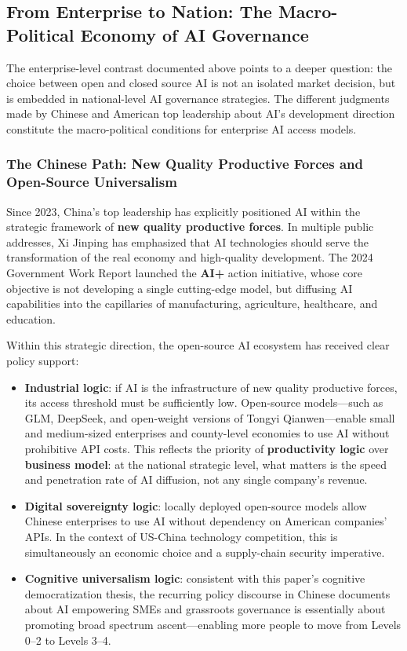 \subsection{From Enterprise to Nation: The Macro-Political Economy of AI Governance}

The enterprise-level contrast documented above points to a deeper question: the choice between open and closed source AI is not an isolated market decision, but is embedded in national-level AI governance strategies. The different judgments made by Chinese and American top leadership about AI's development direction constitute the macro-political conditions for enterprise AI access models.

\subsubsection{The Chinese Path: New Quality Productive Forces and Open-Source Universalism}

Since 2023, China's top leadership has explicitly positioned AI within the strategic framework of \textbf{new quality productive forces}. In multiple public addresses, Xi Jinping has emphasized that AI technologies should serve the transformation of the real economy and high-quality development. The 2024 Government Work Report launched the \textbf{AI+} action initiative, whose core objective is not developing a single cutting-edge model, but diffusing AI capabilities into the capillaries of manufacturing, agriculture, healthcare, and education.

Within this strategic direction, the open-source AI ecosystem has received clear policy support:

\begin{itemize}
\item \textbf{Industrial logic}: if AI is the infrastructure of new quality productive forces, its access threshold must be sufficiently low. Open-source models---such as GLM, DeepSeek, and open-weight versions of Tongyi Qianwen---enable small and medium-sized enterprises and county-level economies to use AI without prohibitive API costs. This reflects the priority of \textbf{productivity logic} over \textbf{business model}: at the national strategic level, what matters is the speed and penetration rate of AI diffusion, not any single company's revenue.
\item \textbf{Digital sovereignty logic}: locally deployed open-source models allow Chinese enterprises to use AI without dependency on American companies' APIs. In the context of US-China technology competition, this is simultaneously an economic choice and a supply-chain security imperative.
\item \textbf{Cognitive universalism logic}: consistent with this paper's cognitive democratization thesis, the recurring policy discourse in Chinese documents about AI empowering SMEs and grassroots governance is essentially about promoting broad spectrum ascent---enabling more people to move from Levels 0--2 to Levels 3--4.
\end{itemize}


